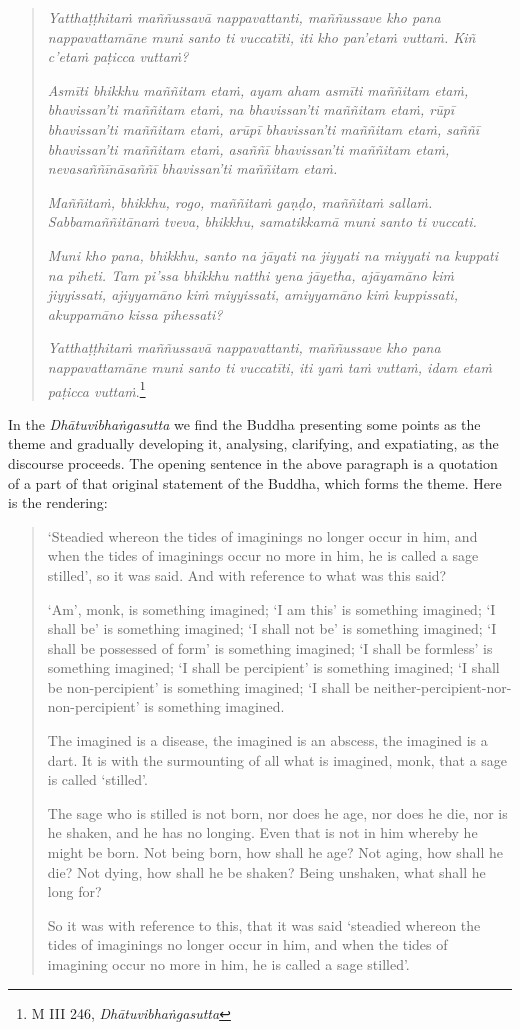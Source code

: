 \begin{quote}
\emph{Yatthaṭṭhitaṁ maññussavā nappavattanti, maññussave kho pana nappavattamāne muni santo ti vuccatīti, iti kho pan'etaṁ vuttaṁ. Kiñ c'etaṁ paṭicca vuttaṁ?}

\emph{Asmīti bhikkhu maññitam etaṁ, ayam aham asmīti maññitam etaṁ, bhavissan'ti maññitam etaṁ, na bhavissan'ti maññitam etaṁ, rūpī bhavissan'ti maññitam etaṁ, arūpī bhavissan'ti maññitam etaṁ, saññī bhavissan'ti maññitam etaṁ, asaññī bhavissan'ti maññitam etaṁ, nevasaññīnāsaññī bhavissan'ti maññitam etaṁ.}

\emph{Maññitaṁ, bhikkhu, rogo, maññitaṁ gaṇḍo, maññitaṁ sallaṁ. Sabbamaññitānaṁ tveva, bhikkhu, samatikkamā muni santo ti vuccati.}

\emph{Muni kho pana, bhikkhu, santo na jāyati na jiyyati na miyyati na kuppati na piheti. Tam pi'ssa bhikkhu natthi yena jāyetha, ajāyamāno kiṁ jiyyissati, ajiyyamāno kiṁ miyyissati, amiyyamāno kiṁ kuppissati, akuppamāno kissa pihessati?}

\emph{Yatthaṭṭhitaṁ maññussavā nappavattanti, maññussave kho pana nappavattamāne muni santo ti vuccatīti, iti yaṁ taṁ vuttaṁ, idam etaṁ paṭicca vuttaṁ}.\footnote{M III 246, \emph{Dhātuvibhaṅgasutta}}
\end{quote}

In the \emph{Dhātuvibhaṅgasutta} we find the Buddha presenting some points as the theme and gradually developing it, analysing, clarifying, and expatiating, as the discourse proceeds. The opening sentence in the above paragraph is a quotation of a part of that original statement of the Buddha, which forms the theme. Here is the rendering:

\begin{quote}
`Steadied whereon the tides of imaginings no longer occur in him, and when the tides of imaginings occur no more in him, he is called a sage stilled', so it was said. And with reference to what was this said?

`Am', monk, is something imagined; `I am this' is something imagined; `I shall be' is something imagined; `I shall not be' is something imagined; `I shall be possessed of form' is something imagined; `I shall be formless' is something imagined; `I shall be percipient' is something imagined; `I shall be non-percipient' is something imagined; `I shall be neither-percipient-nor-\\ non-percipient' is something imagined.

The imagined is a disease, the imagined is an abscess, the imagined is a dart. It is with the surmounting of all what is imagined, monk, that a sage is called `stilled'.

The sage who is stilled is not born, nor does he age, nor does he die, nor is he shaken, and he has no longing. Even that is not in him whereby he might be born. Not being born, how shall he age? Not aging, how shall he die? Not dying, how shall he be shaken? Being unshaken, what shall he long for?

So it was with reference to this, that it was said `steadied whereon the tides of imaginings no longer occur in him, and when the tides of imagining occur no more in him, he is called a sage stilled'.
\end{quote}

